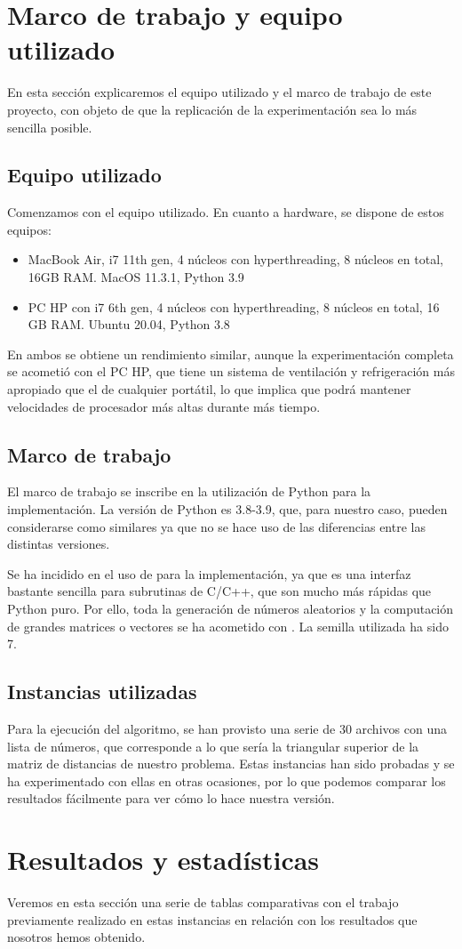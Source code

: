 \section{Marco de trabajo y equipo utilizado}
En esta sección explicaremos el equipo utilizado y el marco de trabajo de este proyecto, con objeto de que la replicación de la experimentación sea lo más sencilla posible.

\subsection{Equipo utilizado}
Comenzamos con el equipo utilizado. En cuanto a hardware, se dispone de estos equipos:

\begin{itemize}
    \item MacBook Air, i7 11th gen, 4 núcleos con hyperthreading, 8 núcleos en total, 16GB RAM. MacOS 11.3.1, Python 3.9
    \item PC HP con i7 6th gen, 4 núcleos con hyperthreading, 8 núcleos en total, 16 GB RAM. Ubuntu 20.04, Python 3.8
\end{itemize}

En ambos se obtiene un rendimiento similar, aunque la experimentación completa se acometió con el PC HP, que tiene un sistema de ventilación y refrigeración más apropiado que el de cualquier portátil, lo que implica que podrá mantener velocidades de procesador más altas durante más tiempo.

\subsection{Marco de trabajo}
El marco de trabajo se inscribe en la utilización de Python para la implementación. La versión de Python es 3.8-3.9, que, para nuestro caso, pueden considerarse como similares ya que no se hace uso de las diferencias entre las distintas versiones.

Se ha incidido en el uso de  para la implementación, ya que es una interfaz bastante sencilla para subrutinas de C/C++, que son mucho más rápidas que Python puro. Por ello, toda la generación de números aleatorios y la computación de grandes matrices o vectores se ha acometido con . La semilla utilizada ha sido 7.

\subsection{Instancias utilizadas}
Para la ejecución del algoritmo, se han provisto una serie de 30 archivos con una lista de números, que corresponde a lo que sería la triangular superior de la matriz de distancias de nuestro problema. Estas instancias han sido probadas y se ha experimentado con ellas en otras ocasiones, por lo que podemos comparar los resultados fácilmente para ver cómo lo hace nuestra versión.

\section{Resultados y estadísticas}
Veremos en esta sección una serie de tablas comparativas con el trabajo previamente realizado en estas instancias en relación con los resultados que nosotros hemos obtenido.



